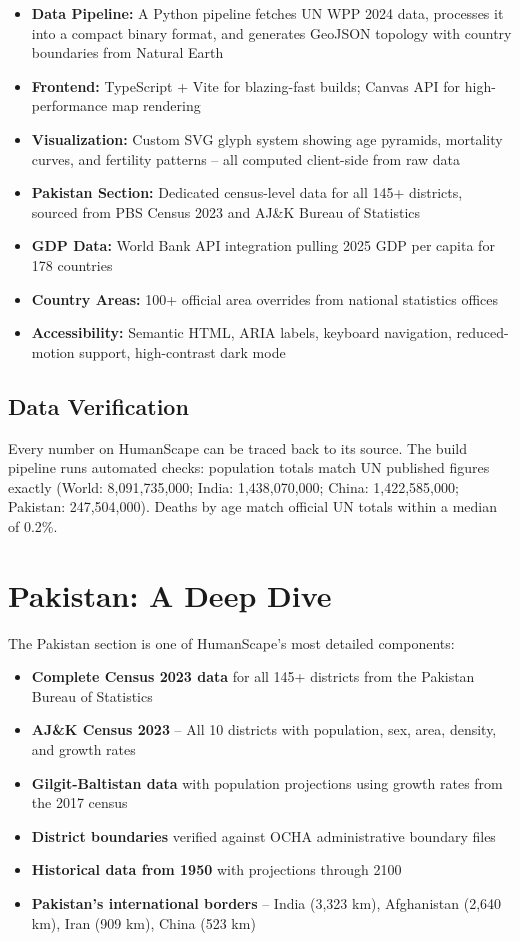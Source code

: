 \documentclass[12pt,a4paper]{article}
\begin{document}
\begin{itemize}[leftmargin=2cm]
\item \textbf{Data Pipeline:} A Python pipeline fetches UN WPP 2024 data, processes
it into a compact binary format, and generates GeoJSON topology with country
boundaries from Natural Earth
\item \textbf{Frontend:} TypeScript + Vite for blazing-fast builds; Canvas API for
high-performance map rendering
\item \textbf{Visualization:} Custom SVG glyph system showing age pyramids, mortality
curves, and fertility patterns -- all computed client-side from raw data
\item \textbf{Pakistan Section:} Dedicated census-level data for all 145+ districts,
sourced from PBS Census 2023 and AJ\&K Bureau of Statistics
\item \textbf{GDP Data:} World Bank API integration pulling 2025 GDP per capita for
178 countries
\item \textbf{Country Areas:} 100+ official area overrides from national statistics offices
\item \textbf{Accessibility:} Semantic HTML, ARIA labels, keyboard navigation,
reduced-motion support, high-contrast dark mode
\end{itemize}

\subsection{Data Verification}

Every number on HumanScape can be traced back to its source. The build pipeline runs
automated checks: population totals match UN published figures exactly (World:
8,091,735,000; India: 1,438,070,000; China: 1,422,585,000; Pakistan: 247,504,000).
Deaths by age match official UN totals within a median of 0.2\%.

\section{Pakistan: A Deep Dive}

The Pakistan section is one of HumanScape's most detailed components:

\begin{itemize}[leftmargin=2cm]
\item \textbf{Complete Census 2023 data} for all 145+ districts from the Pakistan
Bureau of Statistics
\item \textbf{AJ\&K Census 2023} -- All 10 districts with population, sex, area,
density, and growth rates
\item \textbf{Gilgit-Baltistan data} with population projections using growth rates
from the 2017 census
\item \textbf{District boundaries} verified against OCHA administrative boundary files
\item \textbf{Historical data from 1950} with projections through 2100
\item \textbf{Pakistan's international borders} -- India (3,323 km), Afghanistan
(2,640 km), Iran (909 km), China (523 km)
\end{itemize}
\end{document}
